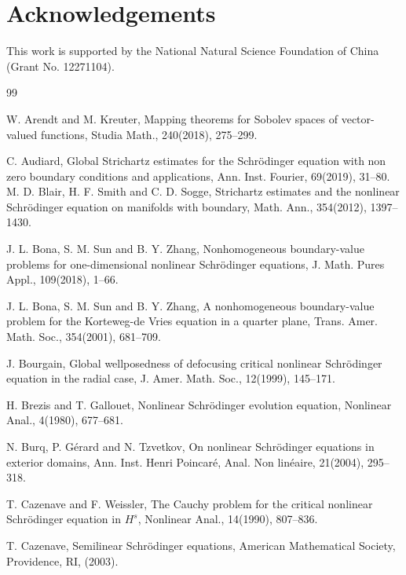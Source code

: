 \documentclass[preprint,compress,12pt]{elsarticle}
\numberwithin{equation}{section}
\begin{document}
\section*{Acknowledgements}
This work is supported by the National Natural Science Foundation of China (Grant No. 12271104).
\begin{thebibliography}{99}
	
	W. Arendt and M. Kreuter, Mapping theorems for Sobolev spaces of vector-valued functions, Studia Math., 240(2018), 275--299.
	
	C. Audiard, Global Strichartz estimates for the Schr\"{o}dinger equation with non zero boundary conditions and applications, Ann. Inst. Fourier, 69(2019), 31--80.
	M. D. Blair, H. F. Smith and C. D. Sogge, Strichartz estimates and the nonlinear Schr\"{o}dinger equation on manifolds with boundary, Math. Ann., 354(2012), 1397--1430.
	
	J. L. Bona, S. M. Sun and B. Y. Zhang, Nonhomogeneous boundary-value problems for one-dimensional nonlinear Schr\"{o}dinger equations, J. Math. Pures Appl., 109(2018), 1--66.
	
	J. L. Bona, S. M. Sun and B. Y. Zhang, A nonhomogeneous boundary-value problem for the Korteweg-de Vries equation in a quarter plane, Trans. Amer. Math. Soc., 354(2001), 681--709.
	
	J. Bourgain, Global wellposedness of defocusing critical nonlinear Schr\"{o}dinger equation in the radial case, J. Amer. Math. Soc., 12(1999), 145--171.
	
	H. Brezis and T. Gallouet, Nonlinear Schr\"{o}dinger evolution equation, Nonlinear Anal., 4(1980), 677--681.
	
	N. Burq, P. G\'{e}rard and N. Tzvetkov, On nonlinear Schr\"{o}dinger equations in exterior domains, Ann. Inst. Henri Poincar\'{e}, Anal. Non lin\'{e}aire, 21(2004), 295--318.
	
	
	
	T. Cazenave and F. Weissler, The Cauchy problem for the critical nonlinear Schr\"{o}dinger equation in $H^{s}$, Nonlinear Anal., 14(1990), 807--836.
	

	
	T. Cazenave, Semilinear Schr\"{o}dinger equations, American Mathematical Society, Providence, RI, (2003).
	

\end{thebibliography}
\end{document}
